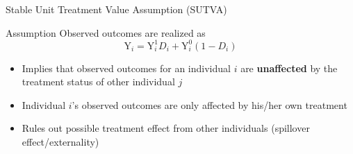 \documentclass[hyperref={pdfpagelabels=false}]{beamer}
\begin{document}
\begin{frame}{Stable Unit Treatment Value Assumption (SUTVA)}
	\begin{block}{Assumption}
		Observed outcomes are realized as 
		\begin{equation*}
		\mathrm{Y}_i=\mathrm{Y}^{1}_{i}D_i+\mathrm{Y}^{0}_{i}(1-D_i)
		\end{equation*}
	\end{block}
	\begin{itemize} 
		\item Implies that observed outcomes for an individual $i$ are \textbf{unaffected} by the treatment status of other individual $j$
		\vspace{0.2cm}
		
		\item Individual $i$'s observed outcomes are only affected by his/her own treatment 
		\vspace{0.2cm}
		\item Rules out possible treatment effect from other individuals (spillover effect/externality)
		
	\end{itemize}
\end{frame}
\end{document}
